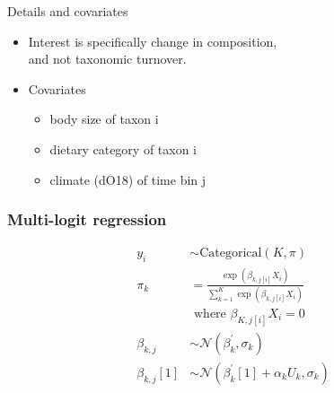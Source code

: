 \documentclass{beamer}
\begin{document}
\begin{frame}
  \begin{block}{Details and covariates}
    \begin{itemize}
      \item Interest is specifically change in \alert{composition}, \\and not taxonomic turnover.
      \item Covariates
        \begin{itemize}
          \item body size of taxon i
          \item dietary category of taxon i
          \item climate (dO18) of time bin j
        \end{itemize}
    \end{itemize}
  \end{block}
\end{frame}



\begin{frame}
  \frametitle{Multi-logit regression}
  \begin{equation*}
    \begin{aligned}
      y_{i} &\sim \mathrm{Categorical}(K, \pi) \\  %
      \pi_{k} &= \frac{\exp(\beta_{k, j[i]} X_{i})}{\sum_{k = 1}^{K} \exp(\beta_{k, j[i]} X_{i})} \\ 
      &\text{ where } \beta_{K, j[i]} X_{i} = 0 \\
      \beta_{k, j} &\sim \mathcal{N}(\beta_{k}^{\prime}, \sigma_{k}) \\
      \beta_{k, j}[1] &\sim \mathcal{N}(\beta_{k}^{\prime}[1] + \alpha_{k} U_{k}, \sigma_{k}) \\
    \end{aligned}
  \end{equation*}
\end{frame}
\end{document}
